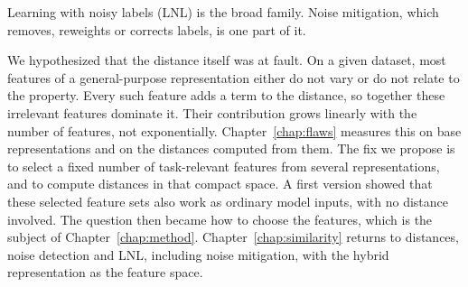 Learning with noisy labels (LNL) is the broad family. Noise mitigation, which removes, reweights or corrects labels, is one part of it.
%

We hypothesized that the distance itself was at fault. On a given dataset, most features of a general-purpose representation either do not vary or do not relate to the property. Every such feature adds a term to the distance, so together these irrelevant features dominate it. Their contribution grows linearly with the number of features, not exponentially. Chapter~\ref{chap:flaws} measures this on base representations and on the distances computed from them. The fix we propose is to select a fixed number of task-relevant features from several representations, and to compute distances in that compact space. A first version showed that these selected feature sets also work as ordinary model inputs, with no distance involved. The question then became how to choose the features, which is the subject of Chapter~\ref{chap:method}. Chapter~\ref{chap:similarity} returns to distances, noise detection and LNL, including noise mitigation, with the hybrid representation as the feature space.

